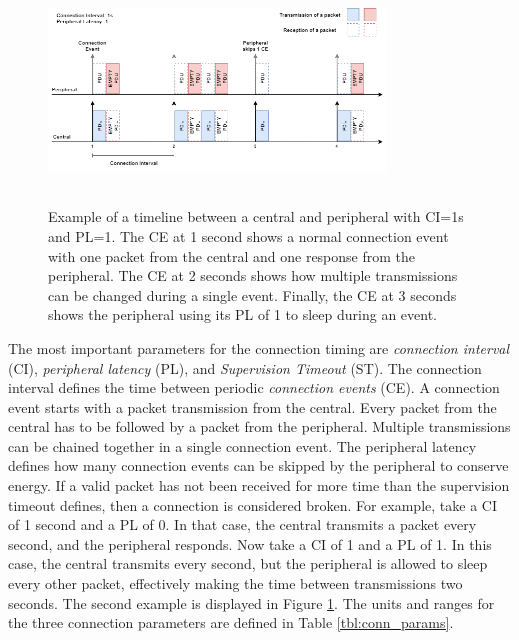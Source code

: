 \begin{figure}[]
    \centering
    \includegraphics[width=0.8\textwidth,height=6cm,keepaspectratio=true]{images/conn_params/conn_params.drawio.png}
    \caption{
        Example of a timeline between a central and peripheral with CI=1s and PL=1. The CE at 1 second shows a normal connection event with one packet from the central and one response from the peripheral. The CE at 2 seconds shows how multiple transmissions can be changed during a single event. Finally, the CE at 3 seconds shows the peripheral using its PL of 1 to sleep during an event.
    }
    \label{fig:ci_and_pl}
\end{figure}

The most important parameters for the connection timing are \textit{connection interval} (CI), \textit{peripheral latency} (PL), and \textit{Supervision Timeout} (ST). The connection interval defines the time between periodic \textit{connection events} (CE). A connection event starts with a packet transmission from the central. Every packet from the central has to be followed by a packet from the peripheral. Multiple transmissions can be chained together in a single connection event. The peripheral latency defines how many connection events can be skipped by the peripheral to conserve energy. If a valid packet has not been received for more time than the supervision timeout defines, then a connection is considered broken. For example, take a CI of 1 second and a PL of 0. In that case, the central transmits a packet every second, and the peripheral responds. Now take a CI of 1 and a PL of 1. In this case, the central transmits every second, but the peripheral is allowed to sleep every other packet, effectively making the time between transmissions two seconds. The second example is displayed in Figure \ref{fig:ci_and_pl}. The units and ranges for the three connection parameters are defined in Table \ref{tbl:conn_params}.

